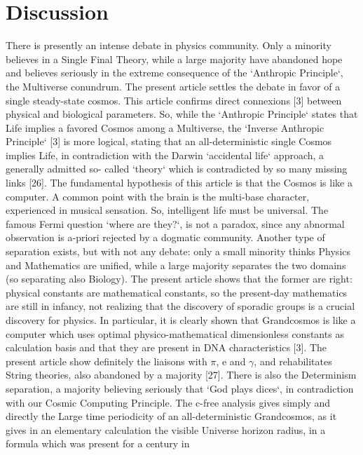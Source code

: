 \documentclass[twoside,draft]{article}
\begin{document}
\begin{sloppypar}
{\section {Discussion}

There is presently an intense debate in physics community. Only a minority believes in a Single
Final Theory, while a large majority have abandoned hope and believes seriously in the extreme
consequence of the `Anthropic Principle`, the Multiverse conundrum. The present article settles the
debate in favor of a single steady-state cosmos.
This article confirms direct connexions [3] between physical and biological parameters. So,
while the `Anthropic Principle` states that Life implies a favored Cosmos among a Multiverse, the
`Inverse Anthropic Principle` [3] is more logical, stating that an all-deterministic single Cosmos
implies Life, in contradiction with the Darwin `accidental life` approach, a generally admitted so-
called `theory` which is contradicted by so many missing links [26]. The fundamental hypothesis of
this article is that the Cosmos is like a computer. A common point with the brain is the multi-base
character, experienced in musical sensation. So, intelligent life must be universal. The famous Fermi
question `where are they?`, is not a paradox, since any abnormal observation is a-priori rejected by a
dogmatic community.
Another type of separation exists, but with not any debate: only a small minority thinks Physics
and Mathematics are unified, while a large majority separates the two domains (so separating also
Biology). The present article shows that the former are right: physical constants are mathematical
constants, so the present-day mathematics are still in infancy, not realizing that the discovery of
sporadic groups is a crucial discovery for physics. In particular, it is clearly shown that
Grandcosmos is like a computer which uses optimal physico-mathematical dimensionless constants as
calculation basis and that they are present in DNA characteristics [3]. The present article show
definitely the liaisons with $\pi$, e and $\gamma$, and rehabilitates String theories, also abandoned by a
majority [27].
There is also the Determinism separation, a majority believing seriously that `God plays dices`,
in contradiction with our Cosmic Computing Principle. The c-free analysis gives simply and
directly the Large time periodicity of an all-deterministic Grandcosmos, as it gives in an elementary
calculation the visible Universe horizon radius, in a formula which was present for a century in
}
\end{sloppypar}
\end{document}
